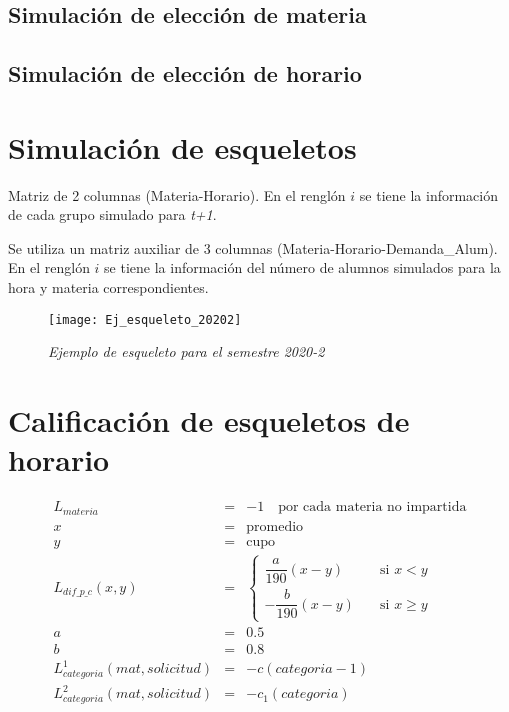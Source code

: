 \subsection{Simulación de elección de materia}

\subsection{Simulación de elección de horario}



\section{Simulación de esqueletos}

Matriz de 2 columnas (Materia-Horario). En el renglón $i$ se tiene la información de cada grupo simulado para \textit{t+1}.

Se utiliza un matriz auxiliar de 3 columnas (Materia-Horario-Demanda\_Alum). En el renglón $i$ se tiene la información del número de alumnos simulados para la hora y materia correspondientes.

\begin{figure}[H]
\centering
\texttt{[image: Ej\_esqueleto\_20202]} %
\caption{\textit{Ejemplo de esqueleto para el semestre 2020-2}}\label{esqueleto20202}
\end{figure}

\section{Calificación de esqueletos de horario}

\begin{eqnarray*}
L_{materia} &=& -1 \,\,\,\,\,\,  \text{por cada materia no impartida}\\
x &=& \text{promedio}\\
y &=& \text{cupo}\\
L_{dif\_p\_c} (x,y) &=& \begin{cases}
    \dfrac{a}{190} (x-y)  & \quad \text{si } x<y\\
    - \dfrac{b}{190} (x-y)  & \quad \text{si } x\geqslant y
  \end{cases}\\
a &=& 0.5\\
b &=& 0.8\\
L_{categoria}^{1} (mat,solicitud) &=& -c(categoria - 1)\\
L_{categoria}^{2} (mat,solicitud) &=& -c_{1}(categoria)
\end{eqnarray*}

